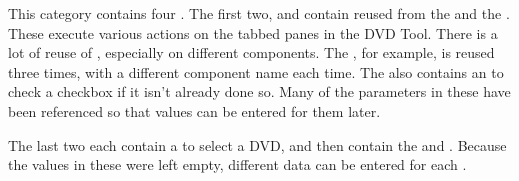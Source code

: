 
This category contains four \gdcases{}. The first two,  and  contain \gdcases{} reused from the  \gdproject{} and the  \gdproject{}. These \gdcases{} execute various actions on the tabbed panes in the DVD Tool. There is a lot of reuse of \gdcases{}, especially on different components. The  \gdcase{}, for example, is reused three times, with a different component name each time. The  \gdcase{} also contains an \gdehandler{} to check a checkbox if it isn't already done so. Many of the parameters in these \gdcases{} have been referenced so that values can be entered for them later. 

The last two \gdcases{} each contain a \gdcase{} to select a DVD, and then contain the  and  \gdcases{}. Because the values in these \gdcases{} were left empty, different data can be entered for each \gdcase{}. 
